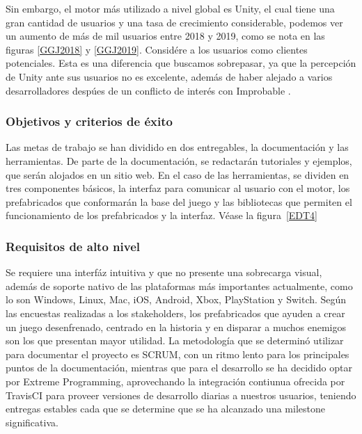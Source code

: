\documentclass[]{article}
\begin{document}
Sin embargo, el motor m\'as utilizado a nivel global es Unity, el cual tiene una gran cantidad de usuarios y una tasa de crecimiento considerable, podemos ver un aumento de m\'as de mil usuarios entre 2018 y 2019, como se nota en las figuras \ref{GGJ2018} y  \ref{GGJ2019}. Consid\'ere a los usuarios como clientes potenciales. Esta es una diferencia que buscamos sobrepasar, ya que la percepci\'on de Unity ante sus usuarios no es excelente, adem\'as de haber alejado a varios desarrolladores desp\'ues de un conflicto de inter\'es con Improbable \cite{Improbable}. 

\subsubsection{Objetivos y criterios de \'exito}
Las metas de trabajo se han dividido en dos entregables, la documentaci\'on y las herramientas. De parte de la documentaci\'on, se redactar\'an tutoriales y ejemplos, que ser\'an alojados en un sitio web. \newline
En el caso de las herramientas, se dividen en tres componentes b\'asicos, la interfaz para comunicar al usuario con el motor, los prefabricados que conformar\'an la base del juego y las bibliotecas que permiten el funcionamiento de los prefabricados y la interfaz. V\'ease la figura~\ref{EDT4}

\subsubsection{Requisitos de alto nivel}
Se requiere una interf\'az intuitiva y que no presente una sobrecarga visual, adem\'as de soporte nativo de las plataformas m\'as importantes actualmente, como lo son Windows, Linux, Mac, iOS, Android, Xbox, PlayStation y Switch.
Seg\'un las encuestas realizadas a los stakeholders, los prefabricados que ayuden a crear un juego desenfrenado, centrado en la historia y en disparar a muchos enemigos son los que presentan mayor utilidad. 
La metodolog\'ia que se determin\'o utilizar para documentar el proyecto es SCRUM, con un ritmo lento para los principales puntos de la documentaci\'on, mientras que para el desarrollo se ha decidido optar por Extreme Programming, aprovechando la integraci\'on contiunua ofrecida por TravisCI para proveer versiones de desarrollo diarias a nuestros usuarios, teniendo entregas estables cada que se determine que se ha alcanzado una milestone significativa. 
\end{document}
